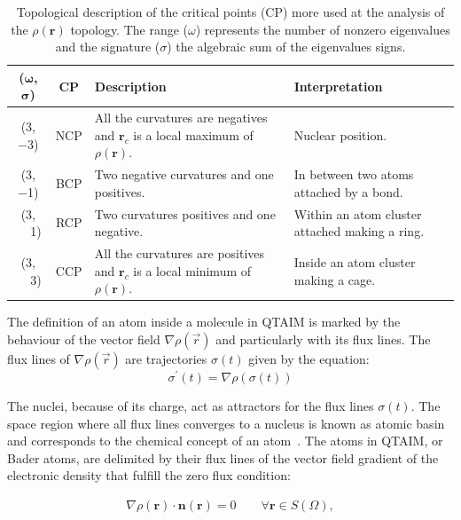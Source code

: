 \begin{table}[ht]
\caption{Topological description of the critical points (CP) more used at the
analysis of the $\rho(\mathbf{r})$ topology. The range ($\omega$) represents
the number of nonzero eigenvalues
and the signature ($\sigma$)
the algebraic sum of the eigenvalues signs.}
\begin{tabular}{c c m{7cm} m{5cm}}
\textbf{($\mathbf{\omega}$, $\mathbf{\sigma}$)} & \textbf{\gls{CP}} & \textbf{Description} & \textbf{Interpretation}\\ \hline \hline
(\num{3}, \num{-3}) & \gls{NCP} & All the curvatures are negatives and $\mathbf{r}_c$ is a local maximum of $\rho(\mathbf{r})$. & Nuclear position.\\ \hline
(\num{3}, \num{-1}) & \gls{BCP} & Two negative curvatures and one positives. & In between two atoms attached by a bond.\\ \hline
(\num{3}, $\phantom{-}$\num{+1}) & \gls{RCP} & Two curvatures positives and one negative. & Within an atom cluster attached making a ring.\\ \hline
(\num{3}, $\phantom{-}$\num{+3}) & \gls{CCP} & All the curvatures are positives and  $\mathbf{r}_c$ is a local minimum of $\rho(\mathbf{r})$. & Inside an atom cluster making a cage.\\
\hline
\end{tabular}
\label{PuntosCriticos}
\end{table}

\newpage

The definition of an atom inside a molecule in QTAIM is marked by the 
behaviour of the vector field $\nabla\rho(\vec{r})$ and particularly with
its flux lines. The flux lines of $\nabla\rho(\vec{r})$ are trajectories $\sigma(t)$
given by the equation:
\begin{equation}
\sigma^{\prime}(t) = \nabla\rho\left( \sigma(t)\right) 
\label{fluxlines}
\end{equation}

The nuclei, because of its charge, act as attractors for the flux lines $\sigma(t)$. The
space region where all flux lines converges to a nucleus is known as atomic basin
and corresponds to the chemical concept of an atom~\cite{bader}. The atoms in
QTAIM, or Bader atoms, are delimited by their flux lines of the vector field
gradient of the electronic density that fulfill the zero flux condition:

\begin{align}
\nabla\rho(\mathbf{r})\cdot\mathbf{n(r)} = 0 \qquad \forall\mathbf{r}\in S(\Omega),
\label{cero_f}
\end{align}
%

